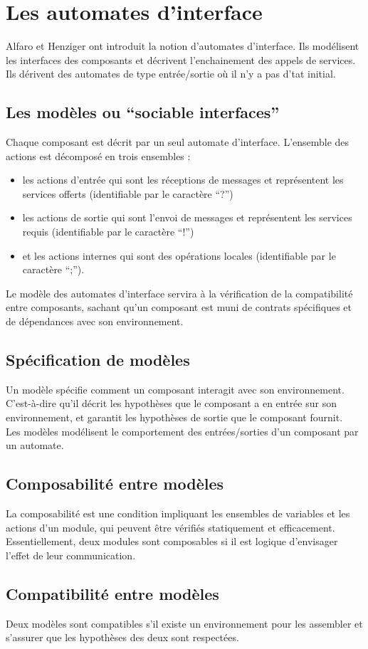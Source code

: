 \chapter{Les automates d'interface}

Alfaro et Henziger ont introduit la notion d'automates d'interface. Ils mod{\'e}lisent les interfaces des composants et d{\'e}crivent l'enchainement des appels de services. Ils d{\'e}rivent des automates de type entr{\'e}e/sortie o{\`u} il n'y a pas d'tat initial.

\section{Les modèles ou \enquote{sociable interfaces}}
Chaque composant est décrit par un seul automate d'interface. 
L'ensemble des actions est décomposé en trois ensembles : 
\begin{itemize}
\item les actions d'entrée qui sont les réceptions de messages et représentent les services offerts (identifiable par le caractère \enquote{?})
\item les actions de sortie qui sont l'envoi de messages et représentent les services requis (identifiable par le caractère \enquote{!})
\item et les actions internes qui sont des opérations locales (identifiable par le caractère \enquote{;}).\\

\end{itemize}

Le modèle des automates d'interface servira à la vérification de la compatibilité entre composants, sachant qu'un composant est muni de contrats spécifiques et de dépendances avec son environnement.

\section{Spécification de modèles}
Un modèle spécifie comment un composant interagit avec son environnement. C'est-à-dire qu'il décrit les hypothèses que le composant a en entrée sur son environnement, et garantit les hypothèses de sortie que le composant fournit.\\
Les modèles modélisent le comportement des entrées/sorties d'un composant par un automate.

\section{Composabilité entre modèles}
La composabilité est une condition impliquant les ensembles de variables et les actions d'un module, qui peuvent être vérifiés statiquement et efficacement. Essentiellement, deux
modules sont composables si il est logique d'envisager l'effet de leur communication.

\section{Compatibilité entre modèles}
Deux modèles sont compatibles s'il existe un environnement pour les assembler et s'assurer que les hypothèses des deux sont respectées.

